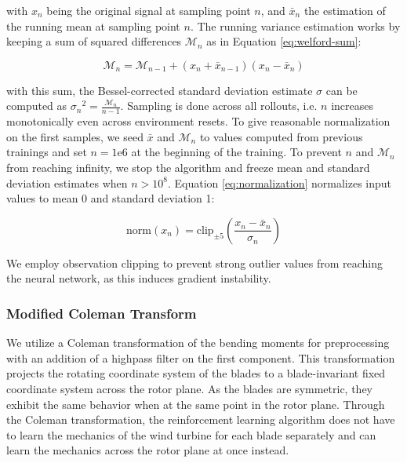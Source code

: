 with $x_n$ being the original signal at sampling point $n$, and $\bar{x}_n$ the estimation of the running mean at sampling point $n$. The running variance estimation works by keeping a sum of squared differences $\mathcal{M}_{n}$ as in Equation \ref{eq:welford-sum}:

\begin{equation}
  \mathcal{M}_{n} = \mathcal{M}_{n-1} + (x_n + \bar{x}_{n-1})(x_n - \bar{x}_n)
  \label{eq:welford-sum}
\end{equation}

with this sum, the Bessel-corrected standard deviation estimate $\sigma$ can be computed as ${\sigma_n}^2 = \frac{\mathcal{M}_{n}}{n-1}$. Sampling is done across all rollouts, i.e. $n$ increases monotonically even across environment resets. To give reasonable normalization on the first samples, we seed $\bar{x}$ and $\mathcal{M}_{n}$ to values computed from previous trainings and set $n=1\text{e}6$ at the beginning of the training. To prevent $n$ and $\mathcal{M}_{n}$ from reaching infinity, we stop the algorithm and freeze mean and standard deviation estimates when $n>10^8$. Equation \ref{eq:normalization} normalizes input values to mean 0 and standard deviation 1:

\begin{equation}
  \text{norm}(x_n)= \text{clip}_{\pm 5} \left( \frac{x_n - \bar{x}_n}{\sigma_n} \right)
  \label{eq:normalization}
\end{equation}

We employ observation clipping to prevent strong outlier values from reaching the neural network, as this induces gradient instability.

\subsubsection{Modified Coleman Transform}

We utilize a Coleman transformation of the bending moments for preprocessing with an addition of a highpass filter on the first component. This transformation projects the rotating coordinate system of the blades to a blade-invariant fixed coordinate system across the rotor plane. As the blades are symmetric, they exhibit the same behavior when at the same point in the rotor plane. Through the Coleman transformation, the reinforcement learning algorithm does not have to learn the mechanics of the wind turbine for each blade separately and can learn the mechanics across the rotor plane at once instead.

